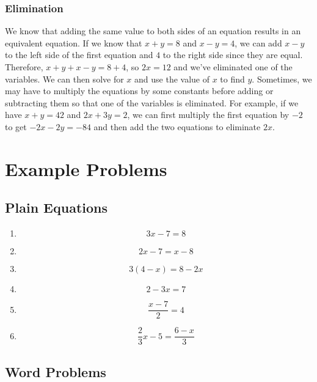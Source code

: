 \documentclass{article}
\begin{document}
    \subsubsection*{Elimination}
    We know that adding the same value to both sides of an equation results in
    an equivalent equation. If we know that $x + y = 8$ and $x - y = 4$, we can
    add $x - y$ to the left side of the first equation and $4$ to the right side
    since they are equal. Therefore, $x + y + x - y = 8 + 4$, so $2x = 12$ and
    we've eliminated one of the variables. We can then solve for $x$ and use the
    value of $x$ to find $y$. Sometimes, we may have to multiply the equations
    by some constants before adding or subtracting them so that one of the
    variables is eliminated. For example, if we have $x + y = 42$ and $2x + 3y =
    2$, we can first multiply the first equation by $-2$ to get $-2x - 2y = -84$
    and then add the two equations to eliminate $2x$.
    \section*{Example Problems}
    \subsection*{Plain Equations}
    \begin{enumerate}
        \item \[3x - 7 = 8\]
        \vspace{2cm}
        \item \[2x - 7 = x - 8\]
        \vspace{2cm}
        \item \[3(4 - x) = 8 - 2x\]
        \vspace{2cm}
        \item \[2 - 3x = 7\]
        \vspace{2cm}
        \item \[\frac{x - 7}{2} = 4\]
        \vspace{2cm}
        \item \[\frac{2}{3}x - 5 = \frac{6 - x}{3}\]
        \vspace{2cm}
    \end{enumerate}
    \subsection*{Word Problems}
\end{document}
